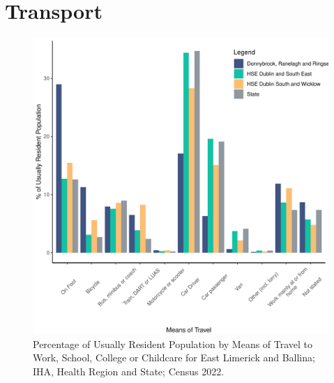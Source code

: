 \documentclass{article}
\begin{document}
\section{Transport}\label{sect:Trans}
\begin{figure}[H]
	\centering
	\includegraphics[width = 120mm]{../figures/TravelED.pdf}
	\caption{Percentage of Usually Resident Population by Means of Travel to Work, School, College or Childcare for East Limerick and Ballina; IHA, Health Region and State; Census 2022.}
	\label{fig:vbnv}
	\end{figure}
\end{document}
